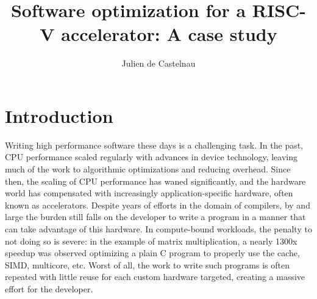 \documentclass[acmsmall, nonacm=true]{acmart}
\begin{document}
\sloppy %

\title{Software optimization for a RISC-V accelerator: A case study}

\author{Julien de Castelnau}

\renewcommand{\shortauthors}{de Castelnau}


\maketitle

\section{Introduction} 
Writing high performance software these days is a challenging task. In the past, CPU performance scaled regularly with advances in device technology, leaving much of the work to algorithmic optimizations and reducing overhead. Since then, the scaling of CPU performance has waned significantly, and the hardware world has compensated with increasingly application-specific hardware, often known as accelerators. Despite years of efforts in the domain of compilers, by and large the burden still falls on the developer to write a program in a manner that can take advantage of this hardware. In compute-bound workloads, the penalty to not doing so is severe: in the example of matrix multiplication, a nearly 1300x speedup was observed optimizing a plain C program to properly use the cache, SIMD, multicore, etc. Worst of all, the work to write such programs is often repeated with little reuse for each custom hardware targeted, creating a massive effort for the developer.
\end{document}
